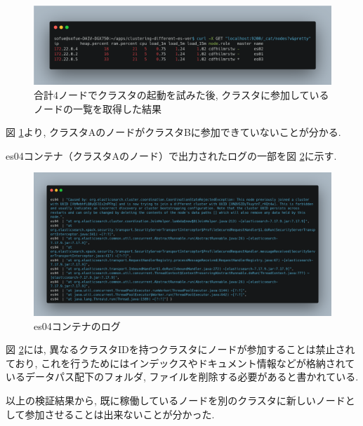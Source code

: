 \begin{figure}[!ht]
  \begin{center}
    \includegraphics[width=160mm]{sotu/figure/4nodes-list.png}
    \caption{合計4ノードでクラスタの起動を試みた後, クラスタに参加しているノードの一覧を取得した結果}
    \label{p3-1}
  \end{center}
\end{figure}

図 \ref{p3-1}より, クラスタAのノードがクラスタBに参加できていないことが分かる.

es04コンテナ（クラスタAのノード）で出力されたログの一部を図 \ref{p3-2}に示す.

\begin{figure}[!ht]
  \begin{center}
    \includegraphics[width=160mm]{sotu/figure/es04-log.png}
    \caption{es04コンテナのログ}
    \label{p3-2}
  \end{center}
\end{figure}

図 \ref{p3-2}には, 異なるクラスタIDを持つクラスタにノードが参加することは禁止されており, これを行うためにはインデックスやドキュメント情報などが格納されているデータパス配下のフォルダ, ファイルを削除する必要があると書かれている.

以上の検証結果から, 既に稼働しているノードを別のクラスタに新しいノードとして参加させることは出来ないことが分かった.


